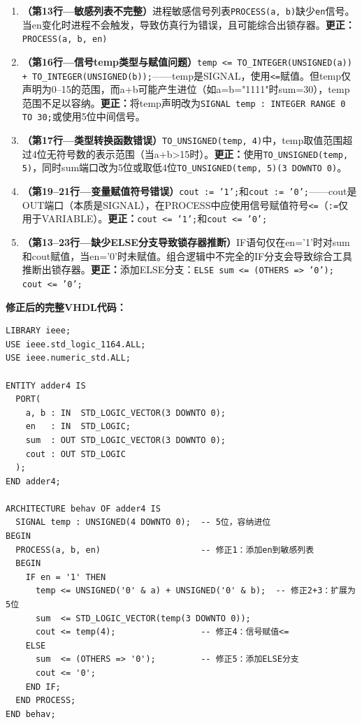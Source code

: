 \begin{enumerate}[label=\textbf{错误\arabic*：}, leftmargin=*]

\item \textbf{（第13行—敏感列表不完整）}进程敏感信号列表\texttt{PROCESS(a, b)}缺少\texttt{en}信号。当en变化时进程不会触发，导致仿真行为错误，且可能综合出锁存器。\textbf{更正：}\texttt{PROCESS(a, b, en)}

\item \textbf{（第16行—信号temp类型与赋值问题）}\texttt{temp <= TO\_INTEGER(UNSIGNED(a)) + TO\_INTEGER(UNSIGNED(b));}——temp是SIGNAL，使用\verb|<=|赋值。但temp仅声明为0--15的范围，而a+b可能产生进位（如a=b="1111"时sum=30），temp范围不足以容纳。\textbf{更正：}将temp声明改为\texttt{SIGNAL temp : INTEGER RANGE 0 TO 30;}或使用5位中间信号。

\item \textbf{（第17行—类型转换函数错误）}\texttt{TO\_UNSIGNED(temp, 4)}中，temp取值范围超过4位无符号数的表示范围（当a+b>15时）。\textbf{更正：}使用\texttt{TO\_UNSIGNED(temp, 5)}，同时sum端口改为5位或取低4位\texttt{TO\_UNSIGNED(temp, 5)(3 DOWNTO 0)}。

\item \textbf{（第19--21行—变量赋值符号错误）}\texttt{cout := '1';}和\texttt{cout := '0';}——cout是OUT端口（本质是SIGNAL），在PROCESS中应使用信号赋值符号\verb|<=|（\verb|:=|仅用于VARIABLE）。\textbf{更正：}\texttt{cout <= '1';}和\texttt{cout <= '0';}

\item \textbf{（第13--23行—缺少ELSE分支导致锁存器推断）}IF语句仅在en='1'时对sum和cout赋值，当en='0'时未赋值。组合逻辑中不完全的IF分支会导致综合工具推断出锁存器。\textbf{更正：}添加ELSE分支：\texttt{ELSE sum <= (OTHERS => '0'); cout <= '0';}

\end{enumerate}

\textbf{修正后的完整VHDL代码：}

\begin{lstlisting}[caption={修正后的4位加法器VHDL代码}]
LIBRARY ieee;
USE ieee.std_logic_1164.ALL;
USE ieee.numeric_std.ALL;

ENTITY adder4 IS
  PORT(
    a, b : IN  STD_LOGIC_VECTOR(3 DOWNTO 0);
    en   : IN  STD_LOGIC;
    sum  : OUT STD_LOGIC_VECTOR(3 DOWNTO 0);
    cout : OUT STD_LOGIC
  );
END adder4;

ARCHITECTURE behav OF adder4 IS
  SIGNAL temp : UNSIGNED(4 DOWNTO 0);  -- 5位，容纳进位
BEGIN
  PROCESS(a, b, en)                    -- 修正1：添加en到敏感列表
  BEGIN
    IF en = '1' THEN
      temp <= UNSIGNED('0' & a) + UNSIGNED('0' & b);  -- 修正2+3：扩展为5位
      sum  <= STD_LOGIC_VECTOR(temp(3 DOWNTO 0));
      cout <= temp(4);                 -- 修正4：信号赋值<=
    ELSE
      sum  <= (OTHERS => '0');         -- 修正5：添加ELSE分支
      cout <= '0';
    END IF;
  END PROCESS;
END behav;
\end{lstlisting}

